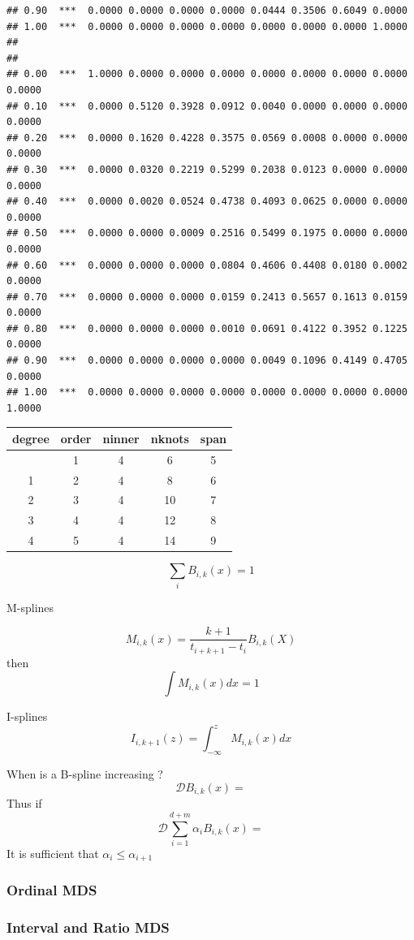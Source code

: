 \documentclass[
  12pt,
]{article}
\begin{document}
\begin{verbatim}
## 0.90  ***  0.0000 0.0000 0.0000 0.0000 0.0444 0.3506 0.6049 0.0000 
## 1.00  ***  0.0000 0.0000 0.0000 0.0000 0.0000 0.0000 0.0000 1.0000 
## 
## 
## 0.00  ***  1.0000 0.0000 0.0000 0.0000 0.0000 0.0000 0.0000 0.0000 0.0000 
## 0.10  ***  0.0000 0.5120 0.3928 0.0912 0.0040 0.0000 0.0000 0.0000 0.0000 
## 0.20  ***  0.0000 0.1620 0.4228 0.3575 0.0569 0.0008 0.0000 0.0000 0.0000 
## 0.30  ***  0.0000 0.0320 0.2219 0.5299 0.2038 0.0123 0.0000 0.0000 0.0000 
## 0.40  ***  0.0000 0.0020 0.0524 0.4738 0.4093 0.0625 0.0000 0.0000 0.0000 
## 0.50  ***  0.0000 0.0000 0.0009 0.2516 0.5499 0.1975 0.0000 0.0000 0.0000 
## 0.60  ***  0.0000 0.0000 0.0000 0.0804 0.4606 0.4408 0.0180 0.0002 0.0000 
## 0.70  ***  0.0000 0.0000 0.0000 0.0159 0.2413 0.5657 0.1613 0.0159 0.0000 
## 0.80  ***  0.0000 0.0000 0.0000 0.0010 0.0691 0.4122 0.3952 0.1225 0.0000 
## 0.90  ***  0.0000 0.0000 0.0000 0.0000 0.0049 0.1096 0.4149 0.4705 0.0000 
## 1.00  ***  0.0000 0.0000 0.0000 0.0000 0.0000 0.0000 0.0000 0.0000 1.0000
\end{verbatim}

\begin{longtable}[]{@{}ccccc@{}}
\toprule\noalign{}
degree & order & ninner & nknots & span \\
\midrule\noalign{}
\endhead
\bottomrule\noalign{}
\endlastfoot
0 & 1 & 4 & 6 & 5 \\
1 & 2 & 4 & 8 & 6 \\
2 & 3 & 4 & 10 & 7 \\
3 & 4 & 4 & 12 & 8 \\
4 & 5 & 4 & 14 & 9 \\
\end{longtable}

\[
\sum_i B_{i,k}(x)=1
\]

M-splines

\[
M_{i,k}(x)=\frac{k+1}{t_{i+k+1}-t_i}B_{i,k}(X)
\]
then
\[
\int M_{i,k}(x)dx=1
\]

I-splines
\[
I_{i,k+1}(z)=\int_{-\infty}^zM_{i,k}(x)dx
\]

When is a B-spline increasing ?
\[
\mathcal{D}B_{i,k}(x)=
\]
Thus if
\[
\mathcal{D}\sum_{i=1}^{d+m}\alpha_iB_{i,k}(x)=
\]
It is sufficient that \(\alpha_i\leq\alpha_{i+1}\)

\subsubsection{Ordinal MDS}\label{ordinal-mds}

\subsubsection{Interval and Ratio MDS}\label{interval-and-ratio-mds}
\end{document}
